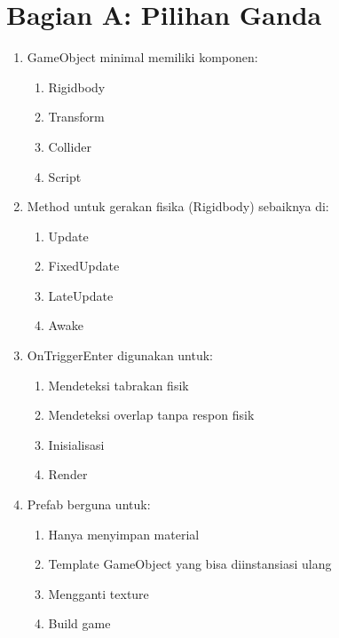 \section{Bagian A: Pilihan Ganda}

\begin{enumerate}
  \item GameObject minimal memiliki komponen:
  \begin{enumerate}
    \item Rigidbody
    \item Transform
    \item Collider
    \item Script
  \end{enumerate}
  
  \item Method untuk gerakan fisika (Rigidbody) sebaiknya di:
  \begin{enumerate}
    \item Update
    \item FixedUpdate
    \item LateUpdate
    \item Awake
  \end{enumerate}
  
  \item OnTriggerEnter digunakan untuk:
  \begin{enumerate}
    \item Mendeteksi tabrakan fisik
    \item Mendeteksi overlap tanpa respon fisik
    \item Inisialisasi
    \item Render
  \end{enumerate}
  
  \item Prefab berguna untuk:
  \begin{enumerate}
    \item Hanya menyimpan material
    \item Template GameObject yang bisa diinstansiasi ulang
    \item Mengganti texture
    \item Build game
  \end{enumerate}
\end{enumerate}
